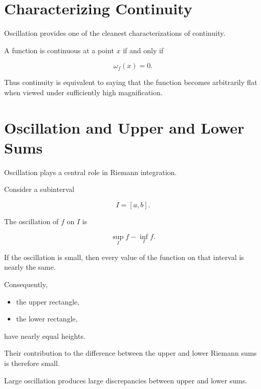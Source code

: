 \documentclass{essay}
\begin{document}

\section{Characterizing Continuity}

Oscillation provides one of the cleanest characterizations of continuity.

\begin{theorem}

A function is continuous at a point $x$ if and only if

\[
\omega_f(x)=0.
\]

\end{theorem}

Thus continuity is equivalent to saying that the function becomes arbitrarily
flat when viewed under sufficiently high magnification.


\section{Oscillation and Upper and Lower Sums}

Oscillation plays a central role in Riemann integration.

Consider a subinterval

\[
I=[a,b].
\]

The oscillation of $f$ on $I$ is

\[
\sup_I f-\inf_I f.
\]

If the oscillation is small, then every value of the function on that interval
is nearly the same.

Consequently,

\begin{itemize}
\item the upper rectangle,
\item the lower rectangle,
\end{itemize}

have nearly equal heights.

Their contribution to the difference between the upper and lower Riemann sums is
therefore small.

Large oscillation produces large discrepancies between upper and lower sums.

\end{document}

